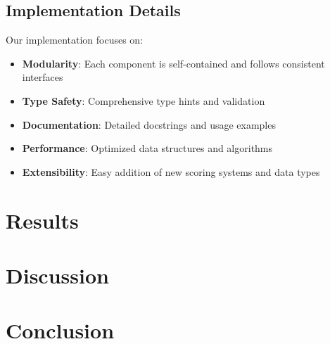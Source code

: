\documentclass[12pt]{article}
\begin{document}
\subsection{Implementation Details}

Our implementation focuses on:
\begin{itemize}
    \item \textbf{Modularity}: Each component is self-contained and follows consistent interfaces
    \item \textbf{Type Safety}: Comprehensive type hints and validation
    \item \textbf{Documentation}: Detailed docstrings and usage examples
    \item \textbf{Performance}: Optimized data structures and algorithms
    \item \textbf{Extensibility}: Easy addition of new scoring systems and data types
\end{itemize}

\section{Results}

\section{Discussion}

\section{Conclusion}



\end{document}
